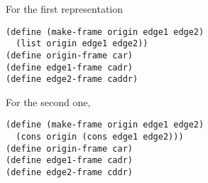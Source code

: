 \documentclass[a4paper,12pt]{article}
\begin{document}
For the first representation
\begin{lstlisting}
(define (make-frame origin edge1 edge2)
  (list origin edge1 edge2))
(define origin-frame car)
(define edge1-frame cadr)
(define edge2-frame caddr)
\end{lstlisting}
For the second one,
\begin{lstlisting}
(define (make-frame origin edge1 edge2)
  (cons origin (cons edge1 edge2)))
(define origin-frame car)
(define edge1-frame cadr)
(define edge2-frame cddr)
\end{lstlisting}
\end{document}
